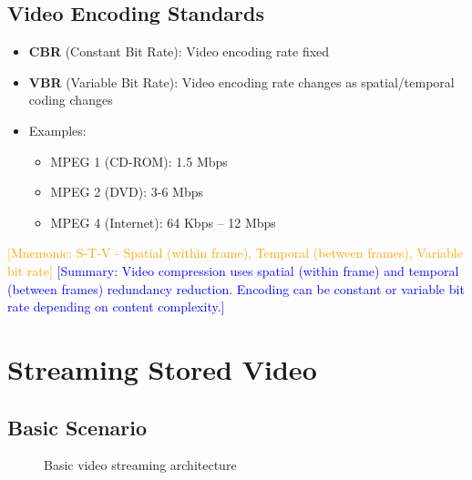 \documentclass[12pt]{article}
\begin{document}
\subsection{Video Encoding Standards}
\begin{itemize}
    \item \textbf{CBR} (Constant Bit Rate): Video encoding rate fixed
    \item \textbf{VBR} (Variable Bit Rate): Video encoding rate changes as spatial/temporal coding changes
    \item Examples:
          \begin{itemize}
              \item MPEG 1 (CD-ROM): 1.5 Mbps
              \item MPEG 2 (DVD): 3-6 Mbps
              \item MPEG 4 (Internet): 64 Kbps – 12 Mbps
          \end{itemize}
\end{itemize}

\textcolor{orange}{[Mnemonic: S-T-V - Spatial (within frame), Temporal (between frames), Variable bit rate]}
\textcolor{blue}{[Summary: Video compression uses spatial (within frame) and temporal (between frames) redundancy reduction. Encoding can be constant or variable bit rate depending on content complexity.]}

\section{Streaming Stored Video}

\subsection{Basic Scenario}
\begin{figure}[h]
    \centering
    \caption{Basic video streaming architecture}
\end{figure}
\end{document}
